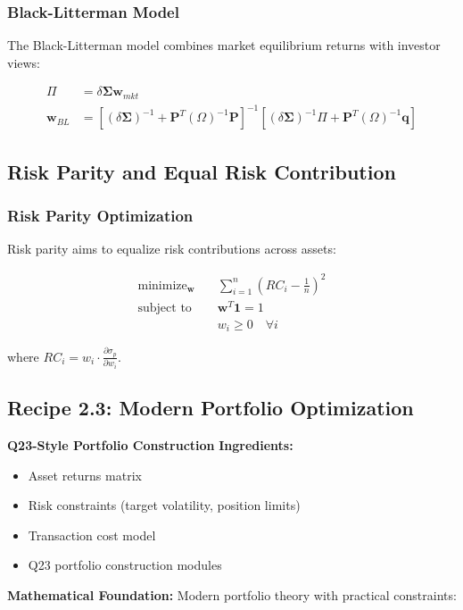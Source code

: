 \documentclass[11pt,letterpaper,openany]{book}
\newcommand{\minimize}{\operatorname{minimize}}
\newcommand{\subjectto}{\operatorname{subject\ to}}
\begin{document}
\subsubsection{Black-Litterman Model}

The Black-Litterman model combines market equilibrium returns with investor views:

\begin{align}
\Pi &= \delta \boldsymbol{\Sigma} \mathbf{w}_{mkt} \\
\mathbf{w}_{BL} &= \left[ (\delta \boldsymbol{\Sigma})^{-1} + \mathbf{P}^T (\Omega)^{-1} \mathbf{P} \right]^{-1} \left[ (\delta \boldsymbol{\Sigma})^{-1} \Pi + \mathbf{P}^T (\Omega)^{-1} \mathbf{q} \right]
\end{align}

\subsection{Risk Parity and Equal Risk Contribution}

\subsubsection{Risk Parity Optimization}

Risk parity aims to equalize risk contributions across assets:

\begin{align}
\minimize_{\mathbf{w}} \quad & \sum_{i=1}^n \left( RC_i - \frac{1}{n} \right)^2 \\
\subjectto \quad & \mathbf{w}^T \mathbf{1} = 1 \\
& w_i \geq 0 \quad \forall i
\end{align}

where $RC_i = w_i \cdot \frac{\partial \sigma_p}{\partial w_i}$.

\subsection{Recipe 2.3: Modern Portfolio Optimization}

\textbf{Q23-Style Portfolio Construction}
\textbf{Ingredients:}
\begin{itemize}
    \item Asset returns matrix
    \item Risk constraints (target volatility, position limits)
    \item Transaction cost model
    \item Q23 portfolio construction modules
\end{itemize}
\textbf{Mathematical Foundation:}
Modern portfolio theory with practical constraints:
\end{document}
